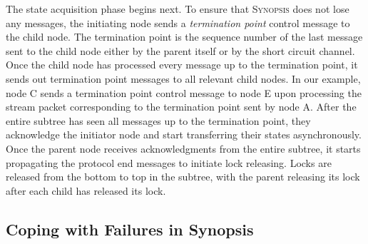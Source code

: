 The state acquisition phase begins next.
To ensure that \textsc{Synopsis} does not lose any messages, the initiating node sends a \emph{termination point} control message to the child node.
The termination point is the sequence number of the last message sent to the child node either by the parent itself or by the short circuit channel.
Once the child node has processed every message up to the termination point, it sends out termination point messages to all relevant child nodes. In our example, node C sends a termination point control message to node E upon processing the stream packet corresponding to the termination point sent by node A.
After the entire subtree has seen all messages up to the termination point, they acknowledge the initiator node and start transferring their states asynchronously.
Once the parent node receives acknowledgments from the entire subtree, it starts propagating the protocol end messages to initiate lock releasing.
Locks are released from the bottom to top in the subtree, with the parent releasing its lock after each child has released its lock.



\subsection{Coping with Failures in Synopsis}



